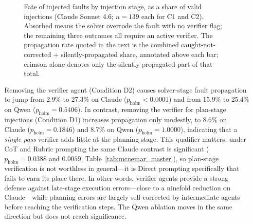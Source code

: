 \documentclass[11pt]{article}
\begin{document}
\begin{figure}[H]
\caption{Fate of injected faults by injection stage, as a share of valid
injections (Claude Sonnet 4.6; $n=139$ each for C1 and C2). Absorbed means
the solver overrode the fault with no verifier flag; the remaining three
outcomes all require an active verifier. The propagation rate quoted in the
text is the combined caught-not-corrected + silently-propagated share,
annotated above each bar; crimson alone denotes only the silently-propagated
part of that total.}\label{fig:fate}
\end{figure}

Removing the verifier agent (Condition D2) causes solver-stage fault propagation to jump from 2.9\% to 27.3\% on Claude ($p_{\mathrm{holm}} < 0.0001$) and from 15.9\% to 25.4\% on Qwen ($p_{\mathrm{holm}} = 0.5406$). In contrast, removing the verifier for plan-stage injections (Condition D1) increases propagation only modestly, to 8.6\% on Claude ($p_{\mathrm{holm}} = 0.1846$) and 8.7\% on Qwen ($p_{\mathrm{holm}} = 1.0000$), indicating that a \emph{single-pass} verifier adds little at the planning stage. This qualifier matters: under CoT and Rubric prompting the same Claude contrast is significant ($p_{\mathrm{holm}} = 0.0388$ and $0.0059$, Table~\ref{tab:mcnemar_master}), so plan-stage verification is not worthless in general---it is Direct prompting specifically that fails to earn its place there. In other words, verifier agents provide a strong defense against late-stage execution errors---close to a ninefold reduction on Claude---while planning errors are largely self-corrected by intermediate agents before reaching the verification steps. The Qwen ablation moves in the same direction but does not reach significance.
\end{document}
